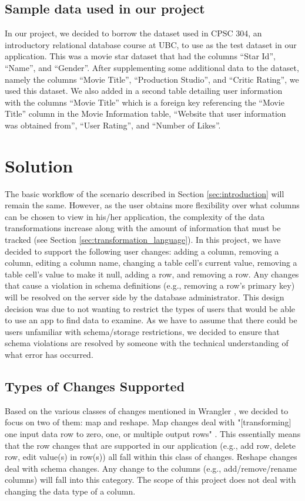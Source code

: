 \documentclass[12pt]{article}
\begin{document}
\subsection{Sample data used in our project}
In our project, we decided to borrow the dataset used in CPSC 304, an introductory relational database course at UBC, to use as the test dataset in our application. This was a movie star dataset that had the columns ``Star Id'', ``Name'', and ``Gender''. After supplementing some additional data to the dataset, namely the columns ``Movie Title'', ``Production Studio'', and ``Critic Rating'', we used this dataset. We also added in a second table detailing user information with the columns ``Movie Title'' which is a foreign key referencing the ``Movie Title'' column in the Movie Information table, ``Website that user information was obtained from'', ``User Rating'', and ``Number of Likes''.

\section{Solution}
The basic workflow of the scenario described in Section \ref{sec:introduction} will remain the same. However, as the user obtains more flexibility over what columns can be chosen to view in his/her application,  the complexity of the data transformations increase along with the amount of information that must be tracked (see Section \ref{sec:transformation_language}). In this project, we have decided to support the following user changes: adding a column, removing a column, editing a column name, changing a table cell's current value, removing a table cell's value to make it null, adding a row, and removing a row. Any changes that cause a violation in schema definitions (e.g., removing a row's primary key) will be resolved on the server side by the database administrator. This design decision was due to not wanting to restrict the types of users that would be able to use an app to find data to examine. As we have to assume that there could be users unfamiliar with schema/storage restrictions, we decided to ensure that schema violations are resolved by someone with the technical understanding of what error has occurred. 

\subsection{Types of Changes Supported}
\label{sec:types_of_changes}
Based on the various classes of changes mentioned in Wrangler \cite{kandel2011wrangler}, we decided to focus on two of them: map and reshape. Map changes deal with "[transforming] one input data row to zero, one, or multiple output rows" \cite{kandel2011wrangler}. This essentially means that the row changes that are supported in our application (e.g., add row, delete row, edit value(s) in row(s)) all fall within this class of changes. Reshape changes deal with schema changes. Any change to the columns (e.g., add/remove/rename columns) will fall into this category. The scope of this project does not deal with changing the data type of a column.
\end{document}
